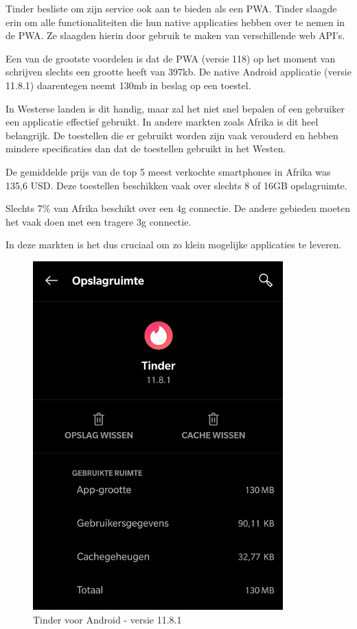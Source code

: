 	Tinder besliste om zijn service ook aan te bieden als een PWA. Tinder slaagde erin om alle functionaliteiten die hun native applicaties hebben over te nemen in de PWA. Ze slaagden hierin door gebruik te maken van verschillende web API's. 
	\autocite{Osmani2017}
	
	Een van de grootste voordelen is dat de PWA (versie 118) op het moment van schrijven slechts een grootte heeft van 397kb. De native Android applicatie (versie 11.8.1) daarentegen neemt 130mb in beslag op een toestel.
	
	In Westerse landen is dit handig, maar zal het niet snel bepalen of een gebruiker een applicatie effectief gebruikt. In andere markten zoals Afrika is dit heel belangrijk. De toestellen die er gebruikt worden zijn vaak verouderd en hebben mindere specificaties dan dat de toestellen gebruikt in het Westen. 
	
	De gemiddelde prijs van de top 5 meest verkochte smartphones in Afrika was 135,6 USD. Deze toestellen beschikken vaak over slechts 8 of 16GB opslagruimte. 
	\autocite{netAdmin2017}
	
	Slechts 7\% van Afrika beschikt over een 4g connectie. De andere gebieden moeten het vaak doen met een tragere 3g connectie.	
	\autocite{gsmArena2020}

	In deze markten is het dus cruciaal om zo klein mogelijke applicaties te leveren.
	
	\begin{figure}[H]
		\centering
		\includegraphics{./img/tinder_native.png}
		\caption{Tinder voor Android -  versie 11.8.1}
	\end{figure}
	
